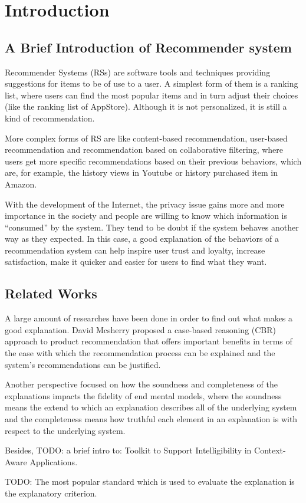 \section{Introduction}
\label{chapter: intro}
\subsection{A Brief Introduction of Recommender system}
    \indent Recommender Systems (RSs) are software tools and techniques providing suggestions for items to be of use to a user\cite{ricci2011introduction}.
    A simplest form of them is a ranking list, where users  can find the most popular items
    and in turn adjust their choices (like the ranking list of AppStore). Although it is not
    personalized, it is still a kind of recommendation. 
    
    \indent More complex forms of RS are like
    content-based recommendation, user-based recommendation and recommendation based on 
    collaborative filtering, where users get more specific recommendations based on their 
    previous behaviors, which are, for example, the history views in Youtube or history purchased item in Amazon.
    
    \indent With the development of the Internet, the privacy issue gains more and more importance in the society
    and people are willing to know which information is ``consumed'' by the system. They tend to be doubt if
    the system behaves another way as they expected. In this case, a good explanation of the behaviors of a recommendation system 
    can help inspire user trust and loyalty, increase satisfaction, make it quicker and easier for users to find what they want\cite{tintarev2007survey}.
\subsection{Related Works}
    \indent A large amount of researches have been done in order to find out what makes a good explanation.
    David Mcsherry proposed a case-based reasoning (CBR) approach\cite{mcsherry2005explanation} to product recommendation
    that offers important benefits in terms of the ease with 
    which the recommendation process can be explained and the system\rq s recommendations can be justified.

    \indent Another perspective focused on how the soundness and completeness of the explanations impacts the fidelity of end  mental models\cite{kulesza2013too},
    where the soundness means the extend to which an explanation describes all of the underlying system
    and the completeness means how truthful each element in an explanation is with respect to the underlying system.

    \indent Besides, TODO: a brief intro to: Toolkit to Support Intelligibility in Context-Aware Applications\cite{lim2010toolkit}.
    
    \indent TODO: The most popular standard which is used to evaluate the explanation is the explanatory criterion\cite{tintarev2007survey}.
